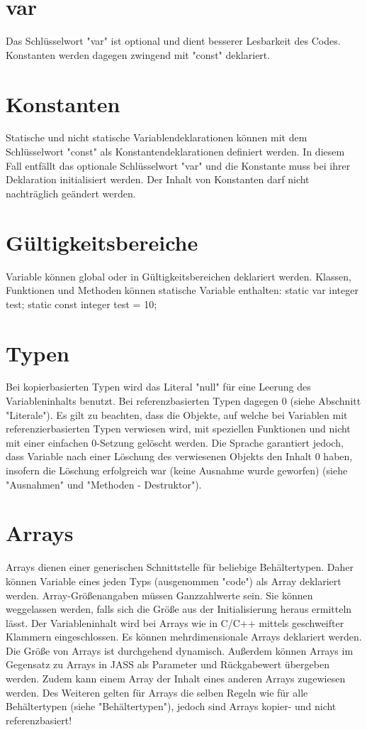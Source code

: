 \section{var}
Das Schlüsselwort "var" ist optional und dient besserer Lesbarkeit des Codes.
Konstanten werden dagegen zwingend mit "const" deklariert.

\section{Konstanten}
Statische und nicht statische Variablendeklarationen können mit dem Schlüsselwort "const" als Konstantendeklarationen definiert
werden.
In diesem Fall entfällt das optionale Schlüsselwort "var" und die Konstante muss bei ihrer Deklaration initialisiert werden.
Der Inhalt von Konstanten darf nicht nachträglich geändert werden.

\section{Gültigkeitsbereiche}
Variable können global oder in Gültigkeitsbereichen deklariert werden.
Klassen, Funktionen und Methoden können statische Variable enthalten:
static var integer test;
static const integer test = 10;

\section{Typen}
Bei kopierbasierten Typen wird das Literal "null" für eine Leerung des Variableninhalts benutzt. Bei referenzbasierten Typen
dagegen 0 (siehe Abschnitt "Literale").
Es gilt zu beachten, dass die Objekte, auf welche bei Variablen mit referenzierbasierten Typen verwiesen wird, mit speziellen Funktionen
und nicht mit einer einfachen 0-Setzung gelöscht werden.
Die Sprache garantiert jedoch, dass Variable nach einer Löschung des verwiesenen Objekts den Inhalt 0 haben, insofern die Löschung
erfolgreich war (keine Ausnahme wurde geworfen) (siehe "Ausnahmen" und "Methoden - Destruktor").

\section{Arrays}
Arrays dienen einer generischen Schnittstelle für beliebige Behältertypen. Daher können Variable eines jeden Typs (ausgenommen "code")
als Array deklariert werden.
Array-Größenangaben müssen Ganzzahlwerte sein. Sie können weggelassen werden, falls sich die Größe aus der Initialisierung heraus
ermitteln lässt.
Der Variableninhalt wird bei Arrays wie in C/C++ mittels geschweifter Klammern eingeschlossen. Es können mehrdimensionale
Arrays deklariert werden. Die Größe von Arrays ist durchgehend dynamisch. Außerdem können Arrays im Gegensatz zu Arrays in JASS
als Parameter und Rückgabewert übergeben werden. Zudem kann einem Array der Inhalt eines anderen Arrays zugewiesen werden.
Des Weiteren gelten für Arrays die selben Regeln wie für alle Behältertypen (siehe "Behältertypen"), jedoch sind Arrays kopier-
und nicht referenzbasiert!

